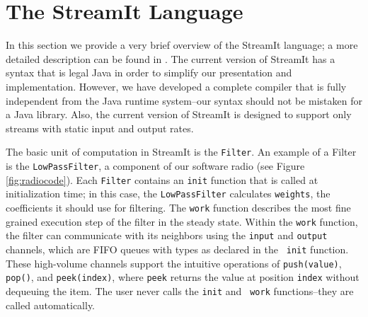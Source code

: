 
\section{The StreamIt Language}
\label{sec:streamit}

In this section we provide a very brief overview of the StreamIt
language; a more detailed description can be found in
\cite{streamitcc}.  The current version of StreamIt has a syntax that
is legal Java in order to simplify our presentation and
implementation.  However, we have developed a complete compiler that
is fully independent from the Java runtime system--our syntax should
not be mistaken for a Java library.  Also, the current version of
StreamIt is designed to support only streams with static input and
output rates.  

The basic unit of computation in StreamIt is the {\tt Filter}.  An
example of a Filter is the {\tt LowPassFilter}, a component of our
software radio (see Figure \ref{fig:radiocode}).  Each {\tt Filter}
contains an {\tt init} function that is called at initialization time;
in this case, the {\tt LowPassFilter} calculates {\tt weights}, the
coefficients it should use for filtering.  The {\tt work} function
describes the most fine grained execution step of the filter in the
steady state.  Within the {\tt work} function, the filter can
communicate with its neighbors using the {\tt input} and {\tt output}
channels, which are FIFO queues with types as declared in the {\tt
init} function.  These high-volume channels support the intuitive
operations of {\tt push(value)}, {\tt pop()}, and {\tt peek(index)},
where {\tt peek} returns the value at position {\tt index} without
dequeuing the item.  The user never calls the {\tt init} and {\tt
work} functions--they are called automatically.


